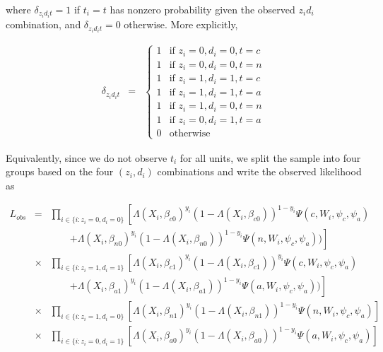 \documentclass[12pt]{article}
\begin{document}
where $\delta_{z_i d_i t} = 1$ if $t_i = t$ has nonzero probability
given the observed $z_i d_i$ combination, and  $\delta_{z_i d_i t} =
0$ otherwise.  More explicitly, 

\begin{eqnarray*}
\delta_{z_i d_i t} & = & \left\{ \begin{array}{ll} 
1 & \textrm{if $z_i = 0, d_i =0, t=c$} \\ 
1 & \textrm{if $z_i = 0, d_i =0, t=n$} \\ 
1 & \textrm{if $z_i = 1, d_i =1, t=c$} \\ 
1 & \textrm{if $z_i = 1, d_i =1, t=a$} \\ 
1 & \textrm{if $z_i = 1, d_i =0, t=n$} \\ 
1 & \textrm{if $z_i = 0, d_i =1, t=a$} \\ 
0 & \mathrm{otherwise} 
\end{array} \right.
\end{eqnarray*}

Equivalently, since we do not observe $t_i$ for all units, we split
the sample into four groups based on the four $(z_i,d_i)$
combinations and write the observed likelihood as

\begin{eqnarray*}
L_{obs} & = & \prod_{i \in \{i:z_i=0,d_i=0\}} \left[
\Lambda(X_i,\beta_{c0})^{y_i} (1-\Lambda(X_i,\beta_{c0}))^{1-y_i}
\Psi(c, W_i, \psi_c,\psi_a) \right. \\
& & \qquad \left. + \Lambda(X_i,\beta_{n0})^{y_i}
(1-\Lambda(X_i,\beta_{n0}))^{1-y_i} \Psi(n, W_i, \psi_c,\psi_a)) \right] \\
& \times &  \prod_{i \in \{i:z_i=1,d_i=1\}} \left[
\Lambda(X_i,\beta_{c1})^{y_i} (1-\Lambda(X_i,\beta_{c1}))^{y_i}
\Psi(c, W_i, \psi_c,\psi_a) \right. \\ 
& & \qquad \left. + \Lambda(X_i,\beta_{a1})^{y_i}
(1-\Lambda(X_i,\beta_{a1}))^{1-y_i} \Psi(a, W_i, \psi_c,\psi_a)) \right] \\
& \times &  \prod_{i \in \{i:z_i=1,d_i=0\}} \left[
\Lambda(X_i,\beta_{n1})^{y_i} (1-\Lambda(X_i,\beta_{n1}))^{1-y_i}
\Psi(n, W_i, \psi_c,\psi_a) \right] \\
& \times &  \prod_{i \in \{i:z_i=0,d_i=1\}} \left[
\Lambda(X_i,\beta_{a0})^{y_i} (1-\Lambda(X_i,\beta_{a0}))^{1-y_i}
\Psi(a, W_i, \psi_c,\psi_a) \right]
\end{eqnarray*}



\end{document}
